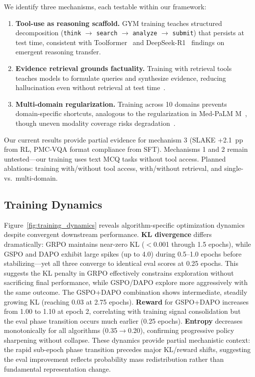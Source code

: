 \documentclass{article}
\begin{document}
We identify three mechanisms, each testable within our framework:
\begin{enumerate}[nosep, leftmargin=*]
    \item \textbf{Tool-use as reasoning scaffold.} GYM training teaches structured decomposition (\texttt{think} $\to$ \texttt{search} $\to$ \texttt{analyze} $\to$ \texttt{submit}) that persists at test time, consistent with Toolformer~\citep{schick2024toolformer} and DeepSeek-R1~\citep{deepseekr1} findings on emergent reasoning transfer.
    \item \textbf{Evidence retrieval grounds factuality.} Training with retrieval tools teaches models to formulate queries and synthesize evidence, reducing hallucination even without retrieval at test time~\citep{lai2025medr1}.
    \item \textbf{Multi-domain regularization.} Training across 10 domains prevents domain-specific shortcuts, analogous to the regularization in Med-PaLM M~\citep{tu2024medpalmm}, though uneven modality coverage risks degradation~\citep{zhang2024biomedgpt}.
\end{enumerate}
Our current results provide partial evidence for mechanism 3 (SLAKE +2.1~pp from RL, PMC-VQA format compliance from SFT). Mechanisms 1 and 2 remain untested---our training uses text MCQ tasks without tool access. Planned ablations: training with/without tool access, with/without retrieval, and single- vs.\ multi-domain.

\subsection{Training Dynamics}

Figure~\ref{fig:training_dynamics} reveals algorithm-specific optimization dynamics despite convergent downstream performance. \textbf{KL divergence} differs dramatically: GRPO maintains near-zero KL ($<$0.001 through 1.5 epochs), while GSPO and DAPO exhibit large spikes (up to 4.0) during 0.5--1.0 epochs before stabilizing---yet all three converge to identical eval scores at 0.25 epochs. This suggests the KL penalty in GRPO effectively constrains exploration without sacrificing final performance, while GSPO/DAPO explore more aggressively with the same outcome. The GSPO+DAPO combination shows intermediate, steadily growing KL (reaching 0.03 at 2.75 epochs). \textbf{Reward} for GSPO+DAPO increases from 1.00 to 1.10 at epoch 2, correlating with training signal consolidation but the eval phase transition occurs much earlier (0.25 epochs). \textbf{Entropy} decreases monotonically for all algorithms (0.35$\to$0.20), confirming progressive policy sharpening without collapse. These dynamics provide partial mechanistic context: the rapid sub-epoch phase transition precedes major KL/reward shifts, suggesting the eval improvement reflects probability mass redistribution rather than fundamental representation change.
\end{document}
